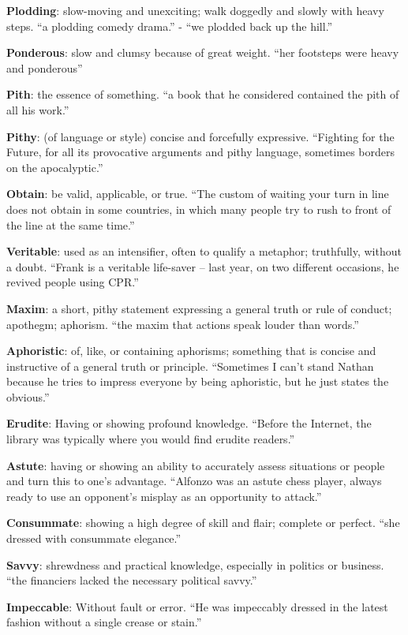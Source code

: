 \documentclass[12pt, a4paper]{ximera}
\begin{document}
\textbf{Plodding}: slow-moving and unexciting; walk doggedly and slowly with heavy steps. ``a plodding comedy drama.'' - ``we plodded back up the hill.''

\textbf{Ponderous}: slow and clumsy because of great weight. ``her footsteps were heavy and ponderous''

\textbf{Pith}: the essence of something. ``a book that he considered contained the pith of all his work.''

\textbf{Pithy}: (of language or style) concise and forcefully expressive. ``Fighting for the Future, for all its provocative arguments and pithy language, sometimes borders on the apocalyptic.''

\textbf{Obtain}: be valid, applicable, or true. ``The custom of waiting your turn in line does not obtain in some countries, in which many people try to rush to front of the line at the same time.''

\textbf{Veritable}: used as an intensifier, often to qualify a metaphor; truthfully, without a doubt. ``Frank is a veritable life-saver -- last year, on two different occasions, he revived people using CPR.''

\textbf{Maxim}: a short, pithy statement expressing a general truth or rule of conduct; apothegm; aphorism. ``the maxim that actions speak louder than words.''

\textbf{Aphoristic}: of, like, or containing aphorisms; something that is concise and instructive of a general truth or principle. ``Sometimes I can't stand Nathan because he tries to impress everyone by being aphoristic, but he just states the obvious.''

\textbf{Erudite}: Having or showing profound knowledge. ``Before the Internet, the library was typically where you would find erudite readers.''

\textbf{Astute}: having or showing an ability to accurately assess situations or people and turn this to one's advantage. ``Alfonzo was an astute chess player, always ready to use an opponent's misplay as an opportunity to attack.''

\textbf{Consummate}: showing a high degree of skill and flair; complete or perfect.  ``she dressed with consummate elegance.''

\textbf{Savvy}: shrewdness and practical knowledge, especially in politics or business. ``the financiers lacked the necessary political savvy.''

\textbf{Impeccable}: Without fault or error. ``He was impeccably dressed in the latest fashion without a single crease or stain.''
\end{document}
